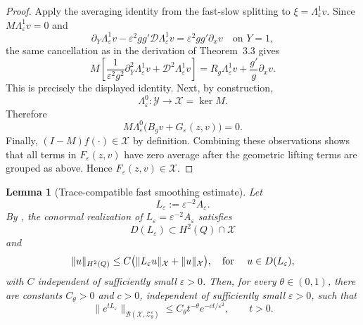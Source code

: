 \documentclass[11pt]{article}
\newtheorem{lemma}[theorem]{Lemma}
\theoremstyle{definition}
\theoremstyle{remark}
\numberwithin{equation}{section}
\newcommand{\mc}[1]{\mathcal{#1}}
\begin{document}
\begin{proof}
Apply the averaging identity from the fast-slow splitting to
\(\xi=\Lambda_\varepsilon^1v\).  Since \(M\Lambda_\varepsilon^1v=0\) and
\[
\partial_Y\Lambda_\varepsilon^1v-\varepsilon^2gg'\mc D\Lambda_\varepsilon^1v
 =\varepsilon^2gg'\partial_xv
 \quad\text{on }Y=1,
\]
the same cancellation as in the derivation of Theorem~3.3 gives
\[
M\left[
 \frac{1}{\varepsilon^2g^2}\partial_Y^2\Lambda_\varepsilon^1v
 +\mc D^2\Lambda_\varepsilon^1v
\right]
=
R_g\Lambda_\varepsilon^1v+\frac{g'}{g}\partial_xv .
\]
This is precisely the displayed identity.  
Next, by construction,
\[
\Lambda_\varepsilon^0:\mc Y\to \mc X=\ker M.
\]
Therefore
\[
M\Lambda_\varepsilon^0\bigl(B_gv+G_\varepsilon(z,v)\bigr)=0.
\]
Finally, \((I-M)f(\cdot)\in \mc X\) by definition. 
Combining these observations shows that all terms in \(F_\varepsilon(z,v)\) have zero average after the geometric lifting terms are grouped as above. 
Hence \(F_\varepsilon(z,v)\in \mc X\).
\end{proof}

\begin{lemma}[Trace-compatible fast smoothing estimate]
\label{lem:trace-compatible-fast-smoothing}
Let
\[
L_\varepsilon:=\varepsilon^{-2}A_\varepsilon .
\]
By , the conormal realization of
\(L_\varepsilon=\varepsilon^{-2}A_\varepsilon\) satisfies
\[
D(L_\varepsilon)\subset H^2(Q)\cap\mathcal X
\]
and
\begin{align} \label{eq:uniform-parameter-elliptic-estimate}
\|u\|_{H^2(Q)}
\le
C\bigl(\|L_\varepsilon u\|_{\mathcal X}+\|u\|_{\mathcal X}\bigr),
\quad \textnormal{for }\quad u\in D(L_\varepsilon),
\end{align}
with \(C\) independent of sufficiently small \(\varepsilon>0\).
Then, for every \(\theta\in(0,1)\), there are constants
\(C_\theta>0\) and \(c>0\), independent of sufficiently small \(\varepsilon>0\), such that
\[
\|e^{tL_\varepsilon}\|_{\mathcal B(\mc X,\mc Z_\theta^\varepsilon)}
 \le C_\theta t^{-\theta}e^{-ct/\varepsilon^2},
 \qquad t>0 .
\]
\end{lemma}
\end{document}
